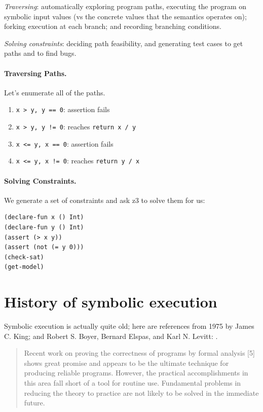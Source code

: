 \documentclass[11pt]{article}
\begin{document}
\emph{Traversing}: automatically exploring program paths, executing the program on symbolic input values (vs the concrete values that the semantics operates on); forking execution at each branch; and recording branching conditions.

\emph{Solving constraints}: deciding path feasibility, and generating test cases to get paths and to find bugs.

\paragraph{Traversing Paths.} Let's enumerate all of the paths.
\begin{enumerate}[noitemsep]
\item \texttt{x > y, y == 0}: assertion fails
\item \texttt{x > y, y != 0}: reaches \texttt{return x / y}
\item \texttt{x <= y, x == 0}: assertion fails
\item \texttt{x <= y, x != 0}: reaches \texttt{return y / x}
\end{enumerate}

\paragraph{Solving Constraints.} We generate a set of constraints and ask z3 to solve them for us:
\begin{lstlisting}
(declare-fun x () Int)
(declare-fun y () Int)
(assert (> x y))
(assert (not (= y 0)))
(check-sat)
(get-model)
\end{lstlisting}

\section*{History of symbolic execution}
Symbolic execution is actually quite old; here are references from 1975 by James C. King; and Robert S. Boyer, Bernard Elspas, and Karl N. Levitt: \cite{boyer75:_selec,king75}.

\begin{quote}
  Recent work on proving the correctness of programs by formal analysis [5] shows great promise and appears to be the ultimate technique for producing reliable programs. However,
  the practical accomplishments in this area fall short of a tool for routine use. Fundamental problems in reducing the theory to practice are not likely to be solved in the immediate future.
\end{quote}
\end{document}
